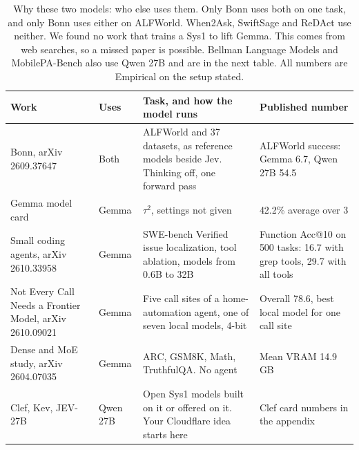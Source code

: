 \documentclass[10pt]{article}
\begin{document}
\begin{table}[H]
\footnotesize
\caption{Why these two models: who else uses them. Only Bonn uses both on one task, and only Bonn uses either on ALFWorld. When2Ask, SwiftSage and ReDAct use neither. We found no work that trains a Sys1 to lift Gemma. This comes from web searches, so a missed paper is possible. Bellman Language Models and MobilePA-Bench also use Qwen 27B and are in the next table. All numbers are Empirical on the setup stated.}
\label{t:prior}
\begin{tabularx}{\linewidth}{@{}P{5.2cm} P{1.9cm} P{5.2cm} L@{}}
\toprule
Work & Uses & Task, and how the model runs & Published number \\
\midrule
Bonn, arXiv 2609.37647 & Both & ALFWorld and 37 datasets, as reference models beside Jev. Thinking off, one forward pass & ALFWorld success: Gemma 6.7, Qwen 27B 54.5 \\
Gemma model card & Gemma & $\tau^2$, settings not given & 42.2\% average over 3 \\
Small coding agents, arXiv 2610.33958 & Gemma & SWE-bench Verified issue localization, tool ablation, models from 0.6B to 32B & Function Acc@10 on 500 tasks: 16.7 with grep tools, 29.7 with all tools \\
Not Every Call Needs a Frontier Model, arXiv 2610.09021 & Gemma & Five call sites of a home-automation agent, one of seven local models, 4-bit & Overall 78.6, best local model for one call site \\
Dense and MoE study, arXiv 2604.07035 & Gemma & ARC, GSM8K, Math, TruthfulQA. No agent & Mean VRAM 14.9\,GB \\
Clef, Kev, JEV-27B & Qwen 27B & Open Sys1 models built on it or offered on it. Your Cloudflare idea starts here & Clef card numbers in the appendix \\
\bottomrule
\end{tabularx}
\end{table}
\end{document}
